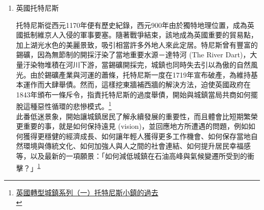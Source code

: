 \documentclass[a4paper,12pt]{article}
\begin{document}
\begin{enumerate}
\item 英國托特尼斯
\label{sec:org81a7421}

托特尼斯從西元1170年便有歷史紀錄，西元900年由於獨特地理位置，成為英國抵制維京人入侵的軍事要塞。隨著戰爭結束，該地成為英國重要的貿易點，加上湖光水色的美麗景致，吸引相當許多外地人來此定居。特尼斯曾有豐富的錫礦，因為無節制的開採汙染了當地重要水源－達特河 (The River Dart)，大量汙染物堆積在河川下游，當錫礦開採完，城鎮也同時失去引以為傲的自然風光。由於錫礦產業與河運的蕭條，托特尼斯一度在1719年宣布破產，為維持基本運作而大肆舉債。然而，這樣挖東牆補西牆的解決方法，迫使英國政府在1843年頒布一條斥令，指責托特尼斯的過度舉債，開始與城鎮當局共商如何擺脫這種惡性循環的悲慘模式。\footnote{\href{https://lowestc.blogspot.com/2016/12/blog-post\_8.html}{英國轉型城鎮系列（一）托特尼斯小鎮的過去 }\\\label{org06cb8a4}}\\

此番低迷景象，開始讓城鎮居民了解永續發展的重要性，而且體會比短期繁榮更重要的事，就是如何保持遠見 (vision)，並回應地方所遭遇的問題，例如如何獲得更穩健的經濟成長、如何讓年輕人獲得更多工作機會、如何保存當地自然環境與傳統文化、如何加強人與人之間的社會連結、如何提升居民幸福感等，以及最新的一項願景：「如何減低城鎮在石油高峰與氣候變遷所受到的衝擊？」\textsuperscript{\ref{org06cb8a4}}\\


\end{enumerate}
\end{document}
